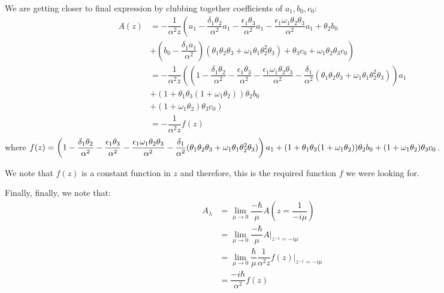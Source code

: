 \documentclass[11pt,a4paper]{article}
\begin{document}
We are getting closer to final expression by clubbing together coefficients of $a_1, b_0, c_0$: 
\begin{align*}
A(z) 
&=-\dfrac{1}{\alpha^2 z} \left(a_1   - \dfrac{ \delta_1  \theta_2 }{\alpha^2} a_1 -\dfrac{\epsilon_1 \theta_3  }{\alpha^2}  a_1  -\dfrac{\epsilon_1   \omega_1  \theta_2 \theta_3 }{\alpha^2} a_1       + \theta_2 b_0   \right. \\
& \left. +  \left( b_0 - \dfrac{ \delta_1  a_1}{\alpha^2}\right)(\theta_1 \theta_2 \theta_3   + \omega_1  \theta_1  \theta_2^2  \theta_3 ) +\theta_3 c_0  +   \omega_1  \theta_2 \theta_3 c_0   \right)\\
&=-\dfrac{1}{\alpha^2 z} \left(\left(1   - \dfrac{ \delta_1  \theta_2 }{\alpha^2} -\dfrac{\epsilon_1 \theta_3  }{\alpha^2}   -\dfrac{\epsilon_1   \omega_1  \theta_2 \theta_3 }{\alpha^2}    - \dfrac{ \delta_1  }{\alpha^2}(\theta_1 \theta_2 \theta_3   + \omega_1  \theta_1  \theta_2^2  \theta_3 ) \right) a_1 \right. \\
& \left. + (1 + \theta_1  \theta_3 (1+   \omega_1   \theta_2   )) \theta_2 b_0  \right. \\
& \left.  +( 1  +   \omega_1  \theta_2 ) \theta_3 c_0   \right)\\
&=-\dfrac{1}{\alpha^2 z} f(z)\\
\end{align*}
where $f(z)=\left(1   - \dfrac{ \delta_1  \theta_2 }{\alpha^2} -\dfrac{\epsilon_1 \theta_3  }{\alpha^2}    -\dfrac{\epsilon_1   \omega_1  \theta_2 \theta_3 }{\alpha^2}       - \dfrac{ \delta_1  }{\alpha^2}(\theta_1 \theta_2 \theta_3   + \omega_1  \theta_1  \theta_2^2  \theta_3 ) \right) a_1
  + (1 + \theta_1  \theta_3 (1+   \omega_1   \theta_2   )) \theta_2 b_0  \\
 +( 1  +   \omega_1  \theta_2 ) \theta_3 c_0   $.
 
 
 We note that $f(z)$ is a constant function in $z$ and therefore, this is the required function $f$ we were looking for.

Finally, finally,  we note that:
\begin{align*}
A_{\lambda}&=   \lim_{\mu \rightarrow 0}  \dfrac{-\hbar}{\mu}  A\left( z=\dfrac{1}{-i \mu}\right)\\
&= \lim_{\mu \rightarrow 0}  \dfrac{-\hbar}{\mu}  A|_{z^{-1}=-i \mu}\\
&= \lim_{\mu \rightarrow 0}  \dfrac{\hbar}{\mu}  \dfrac{1}{\alpha^2 z} f(z)|_{z^{-1}=-i \mu}\\
&=  \dfrac{-i \hbar}{\alpha^2 } f(z)\\
\end{align*}
\end{document}
